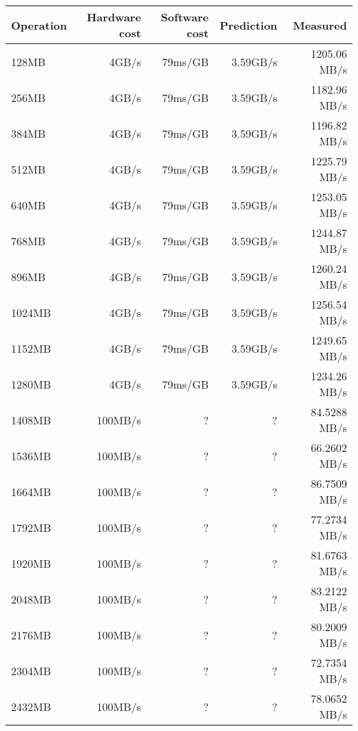 \begin{table}[h]
\begin{center}
\begin{tabular}{| l | r | r | r | r |} \hline
Operation 			& Hardware cost 	& Software cost 	& Prediction	& Measured \\ \hline

128MB  & 4GB/s   & 79ms/GB & 3.59GB/s & 1205.06 MB/s \\ \hline
256MB  & 4GB/s   & 79ms/GB & 3.59GB/s & 1182.96 MB/s \\ \hline
384MB  & 4GB/s   & 79ms/GB & 3.59GB/s & 1196.82 MB/s \\ \hline
512MB  & 4GB/s   & 79ms/GB & 3.59GB/s & 1225.79 MB/s \\ \hline
640MB  & 4GB/s   & 79ms/GB & 3.59GB/s & 1253.05 MB/s \\ \hline
768MB  & 4GB/s   & 79ms/GB & 3.59GB/s & 1244.87 MB/s \\ \hline
896MB  & 4GB/s   & 79ms/GB & 3.59GB/s & 1260.24 MB/s \\ \hline
1024MB & 4GB/s   & 79ms/GB & 3.59GB/s & 1256.54 MB/s \\ \hline
1152MB & 4GB/s   & 79ms/GB & 3.59GB/s & 1249.65 MB/s \\ \hline
1280MB & 4GB/s   & 79ms/GB & 3.59GB/s & 1234.26 MB/s \\ \hline
1408MB & 100MB/s & ?       & ?        & 84.5288 MB/s \\ \hline
1536MB & 100MB/s & ?       & ?        & 66.2602 MB/s \\ \hline
1664MB & 100MB/s & ?       & ?        & 86.7509 MB/s \\ \hline
1792MB & 100MB/s & ?       & ?        & 77.2734 MB/s \\ \hline
1920MB & 100MB/s & ?       & ?        & 81.6763 MB/s \\ \hline
2048MB & 100MB/s & ?       & ?        & 83.2122 MB/s \\ \hline
2176MB & 100MB/s & ?       & ?        & 80.2009 MB/s \\ \hline
2304MB & 100MB/s & ?       & ?        & 72.7354 MB/s \\ \hline
2432MB & 100MB/s & ?       & ?        & 78.0652 MB/s \\ \hline\hline














\end{tabular}
\end{center}
\end{table}
